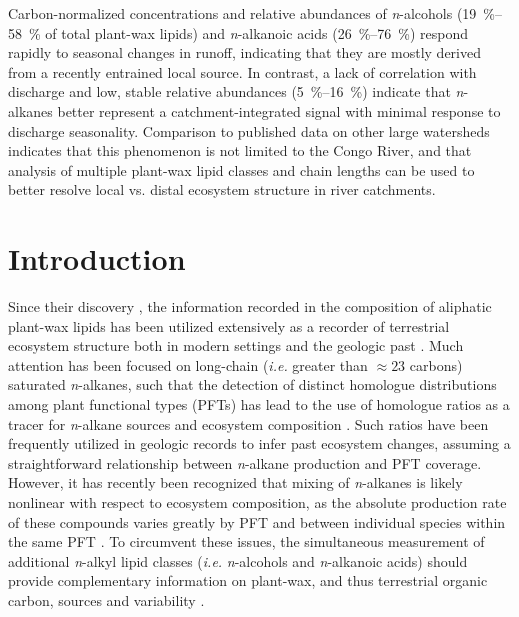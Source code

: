 Carbon-normalized concentrations and relative abundances of \textit{n}-alcohols (\SIrange{19}{58}{\%} of total plant-wax lipids) and \textit{n}-alkanoic acids (\SIrange{26}{76}{\%}) respond rapidly to seasonal changes in runoff, indicating that they are mostly derived from a recently entrained local source. In contrast, a lack of correlation with discharge and low, stable relative abundances (\SIrange{5}{16}{\%}) indicate that \textit{n}-alkanes better represent a catchment-integrated signal with minimal response to discharge seasonality. Comparison to published data on other large watersheds indicates that this phenomenon is not limited to the Congo River, and that analysis of multiple plant-wax lipid classes and chain lengths can be used to better resolve local vs. distal ecosystem structure in river catchments.

\section{Introduction}

Since their discovery \citep{Eglinton:1962uj,Eglinton:1967uz}, the information recorded in the composition of aliphatic plant-wax lipids has been utilized extensively as a recorder of terrestrial ecosystem structure both in modern settings \citep{Diefendorf:2011hg,Bush:2013ie} and the geologic past \citep[see][for review]{Pancost:2004ij,Eglinton:2008hs,Freeman:2014gi}. Much attention has been focused on long-chain (\textit{i.e.} greater than $\approx 23$ carbons) saturated \textit{n}-alkanes, such that the detection of distinct homologue distributions among plant functional types (PFTs) has lead to the use of homologue ratios as a tracer for \textit{n}-alkane sources and ecosystem composition \citep{Ficken:2000wq,Pancost:2002un,Bingham:2010jt}. Such ratios have been frequently utilized in geologic records to infer past ecosystem changes, assuming a straightforward relationship between \textit{n}-alkane production and PFT coverage. However, it has recently been recognized that mixing of \textit{n}-alkanes is likely nonlinear with respect to ecosystem composition, as the absolute production rate of these compounds varies greatly by PFT and between individual species within the same PFT \citep{Rommerskirchen:2006gr,Vogts:2009fb,Diefendorf:2011hg,Bush:2013ie,Magill:2013ab,Garcin:2014hg}. To circumvent these issues, the simultaneous measurement of additional \textit{n}-alkyl lipid classes (\textit{i.e.} \textit{n}-alcohols and \textit{n}-alkanoic acids) should provide complementary information on plant-wax, and thus terrestrial organic carbon, sources and variability \citep[\textit{e.g.}][]{Chikaraishi:2006gb,Jansen:2006bn,Diefendorf:2011hg,Galy:2011ix,Tao:2015bq}.

